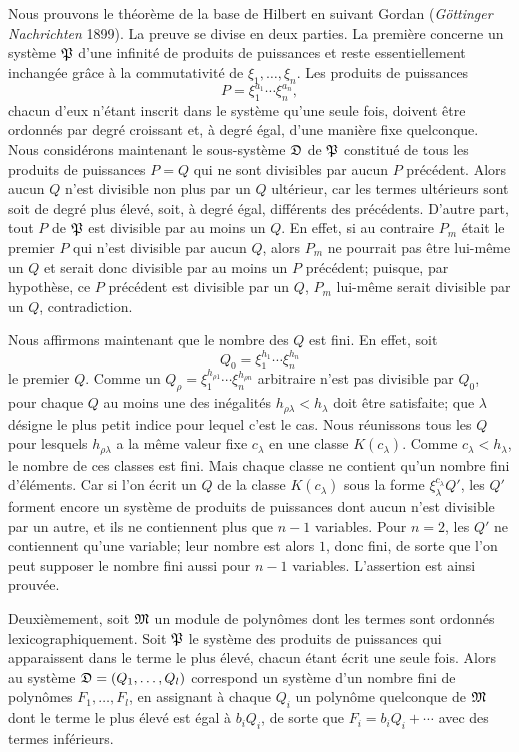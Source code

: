 Nous prouvons le théorème de la base de Hilbert en suivant Gordan (\emph{Göttinger Nachrichten} 1899). La preuve se divise en deux parties. La première concerne un système $\mathfrak P$ d'une infinité de produits de puissances et reste essentiellement inchangée grâce à la commutativité de $\xi_1,\ldots,\xi_n$. Les produits de puissances
\[
 P=\xi_1^{a_1}\cdots\xi_n^{a_n},
\]
chacun d'eux n'étant inscrit dans le système qu'une seule fois, doivent être ordonnés par degré croissant et, à degré égal, d'une manière fixe quelconque. Nous considérons maintenant le sous-système $\mathfrak{D}$ de $\mathfrak P$ constitué de tous les produits de puissances $P=Q$ qui ne sont divisibles par aucun $P$ précédent. Alors aucun $Q$ n'est divisible non plus par un $Q$ ultérieur, car les termes ultérieurs sont soit de degré plus élevé, soit, à degré égal, différents des précédents. D'autre part, tout $P$ de $\mathfrak P$ est divisible par au moins un $Q$. En effet, si au contraire $P_m$ était le premier $P$ qui n'est divisible par aucun $Q$, alors $P_m$ ne pourrait pas être lui-même un $Q$ et serait donc divisible par au moins un $P$ précédent; puisque, par hypothèse, ce $P$ précédent est divisible par un $Q$, $P_m$ lui-même serait divisible par un $Q$, contradiction.

Nous affirmons maintenant que le nombre des $Q$ est fini. En effet, soit
\[
 Q_0=\xi_1^{h_1}\cdots\xi_n^{h_n}
\]
le premier $Q$. Comme un $Q_\rho=\xi_1^{h_{\rho1}}\cdots\xi_n^{h_{\rho n}}$ arbitraire n'est pas divisible par $Q_0$, pour chaque $Q$ au moins une des inégalités $h_{\rho\lambda}<h_\lambda$ doit être satisfaite; que $\lambda$ désigne le plus petit indice pour lequel c'est le cas. Nous réunissons tous les $Q$ pour lesquels $h_{\rho\lambda}$ a la même valeur fixe $c_\lambda$ en une classe $K(c_\lambda)$. Comme $c_\lambda<h_\lambda$, le nombre de ces classes est fini. Mais chaque classe ne contient qu'un nombre fini d'éléments. Car si l'on écrit un $Q$ de la classe $K(c_\lambda)$ sous la forme $\xi_\lambda^{c_\lambda}Q'$, les $Q'$ forment encore un système de produits de puissances dont aucun n'est divisible par un autre, et ils ne contiennent plus que $n-1$ variables. Pour $n=2$, les $Q'$ ne contiennent qu'une variable; leur nombre est alors $1$, donc fini, de sorte que l'on peut supposer le nombre fini aussi pour $n-1$ variables. L'assertion est ainsi prouvée.

Deuxièmement, soit $\mathfrak{M}$ un module de polynômes dont les termes sont ordonnés lexicographiquement. Soit $\mathfrak P$ le système des produits de puissances qui apparaissent dans le terme le plus élevé, chacun étant écrit une seule fois. Alors au système $\mathfrak{D}=(Q_1,\ldots,Q_l)$ correspond un système d'un nombre fini de polynômes $F_1,\ldots,F_l$, en assignant à chaque $Q_i$ un polynôme quelconque de $\mathfrak{M}$ dont le terme le plus élevé est égal à $b_iQ_i$, de sorte que $F_i=b_iQ_i+\cdots$ avec des termes inférieurs.

